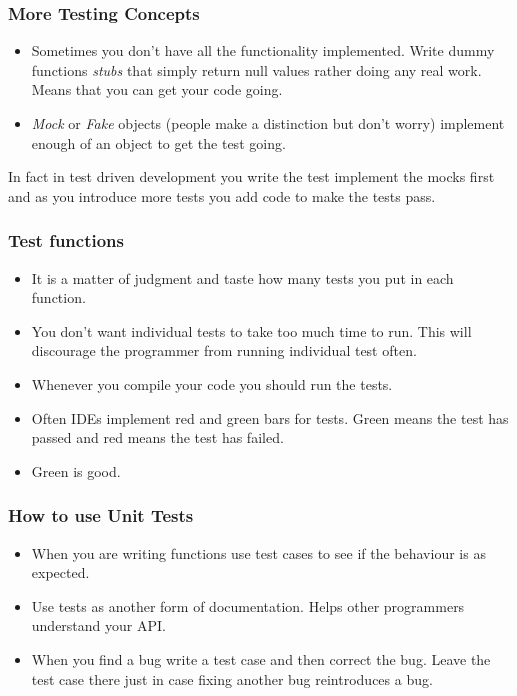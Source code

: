 \documentclass{beamer}
\begin{document}
\begin{frame}
  \frametitle{More Testing Concepts}
  \begin{itemize}
  \item Sometimes you don't have all the functionality
    implemented. Write dummy functions {\em stubs} that simply return
    null values rather doing any real work. Means that you can get
    your code going.
  \item {\em Mock} or {\em Fake} objects (people make a distinction
    but don't worry) implement enough of an object to get the test
    going.
  \end{itemize}
In fact in test driven development you write the test implement the
mocks first and as you introduce more tests you add code to make the
tests pass.

\end{frame}
\begin{frame}
  \frametitle{Test functions}
  \begin{itemize}
  \item It is a matter of judgment and taste how many tests you put in
    each function.
  \item  You don't want individual tests  to take too much time to
    run. This will discourage the programmer from running individual
    test often.
  \item Whenever you compile your code you should run the tests. 
  \item Often IDEs implement red and green bars for tests. Green means
    the test has passed and red means the test has failed.
  \item Green is good. 
  \end{itemize}
\end{frame}
\begin{frame}
  \frametitle{How to use Unit Tests}
  \begin{itemize}
  \item When you are writing functions use test cases to see if the
    behaviour is as expected.
  \item Use tests as another form of documentation. Helps other
    programmers understand your API.
  \item When you find a bug write a test case and then correct the
    bug. Leave the test case there just in case fixing another bug
    reintroduces a bug.
  \end{itemize}
\end{frame}
\end{document}
